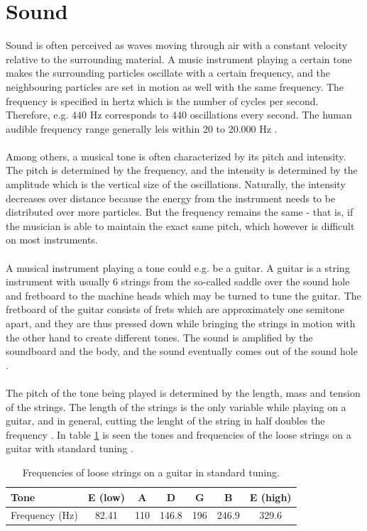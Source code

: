 \section{Sound}
Sound is often perceived as waves moving through air with a constant velocity relative to the surrounding material. A music instrument playing a certain tone makes the surrounding particles oscillate with a certain frequency, and the neighbouring particles are set in motion as well with the same frequency. The frequency is specified in hertz which is the number of cycles per second. Therefore, e.g. $440$ Hz corresponds to $440$ oscillations every second. The human audible frequency range generally leis within 20 to 20.000 Hz \cite{Markandeya}.   
\\ \\
Among others, a musical tone is often characterized by its pitch and intensity. The pitch is determined by the frequency, and the intensity is determined by the amplitude which is the vertical size of the oscillations. Naturally, the intensity decreases over distance because the energy from the instrument needs to be distributed over more particles. But the frequency remains the same - that is, if the musician is able to maintain the exact same pitch, which however is difficult on most instruments.
\\ \\
A musical instrument playing a tone could e.g. be a guitar. A guitar is a string instrument with usually 6 strings from the so-called saddle over the sound hole and fretboard to the machine heads which may be turned to tune the guitar. The fretboard of the guitar consists of frets which are approximately one semitone apart, and they are thus pressed down while bringing the strings in motion with the other hand to create different tones. The sound is amplified by the soundboard and the body, and the sound eventually comes out of the sound hole \cite{WikiGuitar}.
\\ \\
The pitch of the tone being played is determined by the length, mass and tension of the strings. The length of the strings is the only variable while playing on a guitar, and in general, cutting the lenght of the string in half doubles the frequency \cite{AcousticGuitar}. In table \ref{fig:guitar_frequencies} is seen the tones and frequencies of the loose strings on a guitar with standard tuning \cite{guitar_strings}.
\begin{table}[H]
\centering
\begin{tabular}{l|cccccc}
Tone			& E	(low)	& A		& D		& G		& B		& E (high)\\ \hline
Frequency (Hz)	& 82.41		& 110	& 146.8	& 196	& 246.9	& 329.6
\end{tabular}
\caption{Frequencies of loose strings on a guitar in standard tuning.}
\label{fig:guitar_frequencies}
\end{table}
